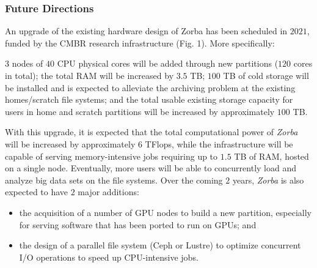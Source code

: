    \subsubsection*{Future Directions}

   An upgrade of the existing hardware design of Zorba has been scheduled in $2021$, funded by the CMBR research infrastructure (Fig. 1). More specifically:

   $3$ nodes of $40$ CPU physical cores will be added through new partitions ($120$ cores in total);
   the total RAM will be increased by $3.5$ TB;
   $100$ TB of cold storage will be installed and is expected to alleviate the archiving problem at the existing homes/scratch file systems; 
   and the total usable existing storage capacity for users in home and scratch partitions will be increased by approximately $100$ TB.
   
   With this upgrade, it is expected that the total computational power of \textit{Zorba} will be increased by approximately $6$ TFlops, while the infrastructure will be capable of serving memory-intensive jobs requiring up to $1.5$ TB of RAM, hosted on a single node. 
   Eventually, more users will be able to concurrently load and analyze big data sets on the file systems. 
   Over the coming $2$ years, \textit{Zorba} is also expected to have $2$ major additions:
   
   \begin{itemize}
      \item  the acquisition of a number of GPU nodes to build a new partition, especially for serving software that has been ported to run on GPUs; and
      \item the design of a parallel file system (Ceph or Lustre) to optimize concurrent I/O operations to speed up CPU-intensive jobs.
   \end{itemize}

